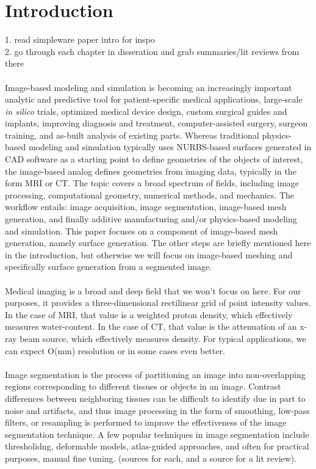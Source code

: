 \section{Introduction}

1. read simpleware paper intro for inspo \\
%
2. go through each chapter in disseration and grab summaries/lit reviews from there \\ \\
%
Image-based modeling and simulation is becoming an increasingly important analytic and predictive tool for patient-specific medical applications, large-scale \textit{in silico} trials, optimized medical device design, custom surgical guides and implants, improving diagnosis and treatment, computer-assisted surgery, surgeon training, and as-built analysis of existing parts. Whereas traditional physics-based modeling and simulation typically uses NURBS-based surfaces generated in CAD software as a starting point to define geometries of the objects of interest, the image-based analog defines geometries from imaging data, typically in the form MRI or CT. The topic covers a broad spectrum of fields, including image processing, computational geometry, numerical methods, and mechanics. The workflow entails: image acquisition, image segmentation, image-based mesh generation, and finally additive manufacturing and/or physics-based modeling and simulation. This paper focuses on a component of image-based mesh generation, namely surface generation. The other steps are briefly mentioned here in the introduction, but otherwise we will focus on image-based meshing and specifically surface generation from a segmented image. \\ \\
%
Medical imaging is a broad and deep field that we won't focus on here. For our purposes, it provides a three-dimensional rectilinear grid of point intensity values. In the case of MRI, that value is a weighted proton density, which effectively measures water-content. In the case of CT, that value is the attenuation of an x-ray beam source, which effectively measures density. For typical applications, we can expect O(mm) resolution or in some cases even better. \\ \\
%
Image segmentation is the process of partitioning an image into non-overlapping regions corresponding to different tissues or objects in an image. Contrast differences between neighboring tissues can be difficult to identify due in part to noise and artifacts, and thus image processing in the form of smoothing, low-pass filters, or resampling is performed to improve the effectiveness of the image segmentation technique. A few popular techniques in image segmentation include thresholidng, deformable models, atlas-guided approaches, and often for practical purposes, manual fine tuning. (sources for each, and a source for a lit review).\\ \\
